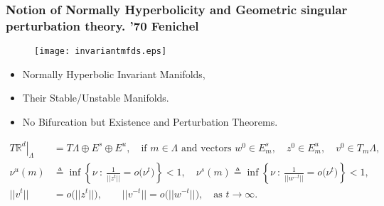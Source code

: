 \documentclass{beamer}
\def\red{\color{red}}
\def\blue{\color{blue}}
\begin{document}
\begin{frame}
\frametitle{Notion of Normally Hyperbolicity and Geometric singular perturbation theory. {\scriptsize\red '70 Fenichel}}
 \begin{minipage}{0.55\linewidth}
  \begin{figure}
    \centering
    \texttt{[image: invariantmfds.eps]}
  \end{figure}
 \end{minipage}
 \begin{minipage}{0.4\linewidth}
 \vfill
 \begin{itemize}
  \item Normally Hyperbolic Invariant Manifolds, 
  \item Their Stable/Unstable Manifolds.
  \item {\red No Bifurcation} but Existence and Perturbation Theorems.
 \end{itemize}
 \vfill
 \end{minipage}
 \pause
 {\scriptsize
 \begin{align*}
  \left.T\mathbb{R}^d\right|_{\Lambda} &= T\Lambda\oplus E^s \oplus E^u, \quad\text{if $m \in \Lambda$ and vectors } w^0\in E^s_m, \quad z^0\in E^u_m, \quad v^0\in T_m\Lambda,\\
  \nu^u(m)&\triangleq \inf\left\{\nu\::\: \frac{1}{||z^{t}||} = o\big(\nu^t\big)\right\}<1,\quad \nu^s(m)\triangleq \inf\left\{\nu\: :\: \frac{1}{||w^{-t}||} = o\big(\nu^t\big) \right\}<1,\\
  ||v^{t}|| &= o\big(||z^{t}||\big), \quad \quad ||v^{-t}|| = o\big(||w^{-t}||\big), \quad \text{as $t \rightarrow \infty$.}
 \end{align*}
 }
\end{frame}
\end{document}
